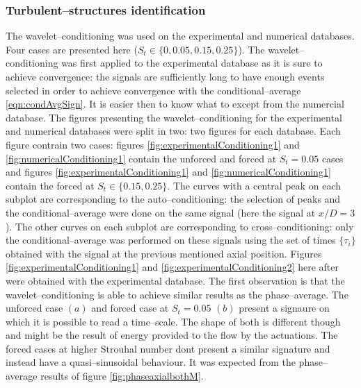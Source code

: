 \documentclass[english]{aiaa-tc}
\begin{document}
\subsubsection{Turbulent--structures identification}

The wavelet--conditioning was used on the experimental and numerical databases. Four cases are presented here ($S_t \in \{0, 0.05, 0.15, 0.25\}$). The wavelet--conditioning was first applied to the experimental database as it is sure to achieve convergence: the signals are sufficiently long to have enough events selected in order to achieve convergence with the conditional--average \ref{eqn:condAvgSign}. It is easier then to know what to except from the numercial database.
The figures presenting the wavelet--conditioning for the experimental and numerical databases were split in two: two figures for each database. Each figure contrain two cases: figures \ref{fig:experimentalConditioning1} and \ref{fig:numericalConditioning1} contain the unforced and forced at $S_t = 0.05$ cases
and figures \ref{fig:experimentalConditioning1} and \ref{fig:numericalConditioning1} contain the forced at $S_t \in \{0.15, 0.25\}$.
The curves with a central peak on each subplot are corresponding to the auto--conditioning: the selection of peaks and the conditional--average were done on the same signal (here the signal at $x/D = 3$). The other curves on each subplot are corresponding to cross--conditioning: only the conditional--average was performed on these signals using the set of times $\{\tau_{i}\}$ obtained with the signal at the previous mentioned axial position.
Figures \ref{fig:experimentalConditioning1} and \ref{fig:experimentalConditioning2} here after were obtained with the experimental database. The first observation is that the wavelet--conditioning is able to achieve similar results as the phase--average. The unforced case $(a)$ and forced case at $S_t = 0.05$ $(b)$ present a signaure on which it is possible to read a time--scale. The shape of both is different though and might be the result of energy provided to the flow by the actuations. The forced cases at higher Strouhal number dont present a similar signature and instead have a quasi--sinusoidal behaviour. It was expected from the phase--average results of figure \ref{fig:phaseaxialbothM}.
\end{document}
